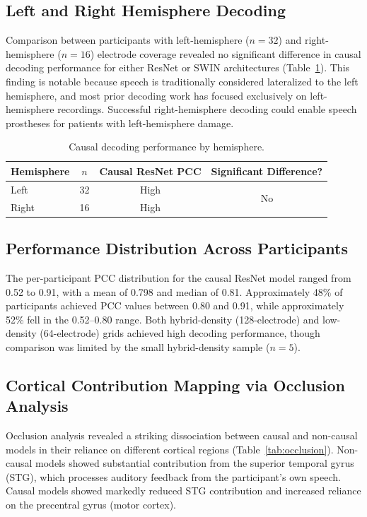 \documentclass[11pt]{article}
\begin{document}
\subsection{Left and Right Hemisphere Decoding}

Comparison between participants with left-hemisphere ($n=32$) and right-hemisphere ($n=16$) electrode coverage revealed no significant difference in causal decoding performance for either ResNet or SWIN architectures (Table~\ref{tab:hemisphere}). This finding is notable because speech is traditionally considered lateralized to the left hemisphere, and most prior decoding work has focused exclusively on left-hemisphere recordings. Successful right-hemisphere decoding could enable speech prostheses for patients with left-hemisphere damage.

\begin{table}[htbp]
\centering
\caption{Causal decoding performance by hemisphere.}
\label{tab:hemisphere}
\begin{tabular}{lccc}
\toprule
\textbf{Hemisphere} & \textbf{$n$} & \textbf{Causal ResNet PCC} & \textbf{Significant Difference?} \\
\midrule
Left & 32 & High & \multirow{2}{*}{No} \\
Right & 16 & High & \\
\bottomrule
\end{tabular}
\end{table}

\subsection{Performance Distribution Across Participants}

The per-participant PCC distribution for the causal ResNet model ranged from 0.52 to 0.91, with a mean of 0.798 and median of 0.81. Approximately 48\% of participants achieved PCC values between 0.80 and 0.91, while approximately 52\% fell in the 0.52--0.80 range. Both hybrid-density (128-electrode) and low-density (64-electrode) grids achieved high decoding performance, though comparison was limited by the small hybrid-density sample ($n=5$).

\subsection{Cortical Contribution Mapping via Occlusion Analysis}

Occlusion analysis revealed a striking dissociation between causal and non-causal models in their reliance on different cortical regions (Table~\ref{tab:occlusion}). Non-causal models showed substantial contribution from the superior temporal gyrus (STG), which processes auditory feedback from the participant's own speech. Causal models showed markedly reduced STG contribution and increased reliance on the precentral gyrus (motor cortex).
\end{document}
